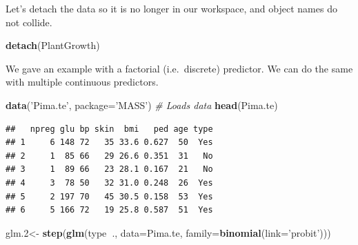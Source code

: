 \documentclass[]{book}
\newenvironment{Shaded}{\begin{snugshade}}{\end{snugshade}}
\newcommand{\CommentTok}[1]{\textcolor[rgb]{0.56,0.35,0.01}{\textit{#1}}}
\newcommand{\DataTypeTok}[1]{\textcolor[rgb]{0.13,0.29,0.53}{#1}}
\newcommand{\FloatTok}[1]{\textcolor[rgb]{0.00,0.00,0.81}{#1}}
\newcommand{\KeywordTok}[1]{\textcolor[rgb]{0.13,0.29,0.53}{\textbf{#1}}}
\newcommand{\NormalTok}[1]{#1}
\newcommand{\OperatorTok}[1]{\textcolor[rgb]{0.81,0.36,0.00}{\textbf{#1}}}
\newcommand{\StringTok}[1]{\textcolor[rgb]{0.31,0.60,0.02}{#1}}
\theoremstyle{definition}
\theoremstyle{definition}
\theoremstyle{definition}
\theoremstyle{remark}
\begin{document}
Let's detach the data so it is no longer in our workspace, and object names do not collide.

\begin{Shaded}
\begin{Highlighting}[]
\KeywordTok{detach}\NormalTok{(PlantGrowth)}
\end{Highlighting}
\end{Shaded}

We gave an example with a factorial (i.e.~discrete) predictor.
We can do the same with multiple continuous predictors.

\begin{Shaded}
\begin{Highlighting}[]
\KeywordTok{data}\NormalTok{(}\StringTok{'Pima.te'}\NormalTok{, }\DataTypeTok{package=}\StringTok{'MASS'}\NormalTok{) }\CommentTok{# Loads data}
\KeywordTok{head}\NormalTok{(Pima.te)}
\end{Highlighting}
\end{Shaded}

\begin{verbatim}
##   npreg glu bp skin  bmi   ped age type
## 1     6 148 72   35 33.6 0.627  50  Yes
## 2     1  85 66   29 26.6 0.351  31   No
## 3     1  89 66   23 28.1 0.167  21   No
## 4     3  78 50   32 31.0 0.248  26  Yes
## 5     2 197 70   45 30.5 0.158  53  Yes
## 6     5 166 72   19 25.8 0.587  51  Yes
\end{verbatim}

\begin{Shaded}
\begin{Highlighting}[]
\NormalTok{glm}\FloatTok{.2}\NormalTok{<-}\StringTok{ }\KeywordTok{step}\NormalTok{(}\KeywordTok{glm}\NormalTok{(type}\OperatorTok{~}\NormalTok{., }\DataTypeTok{data=}\NormalTok{Pima.te, }\DataTypeTok{family=}\KeywordTok{binomial}\NormalTok{(}\DataTypeTok{link=}\StringTok{'probit'}\NormalTok{)))}
\end{Highlighting}
\end{Shaded}
\end{document}

